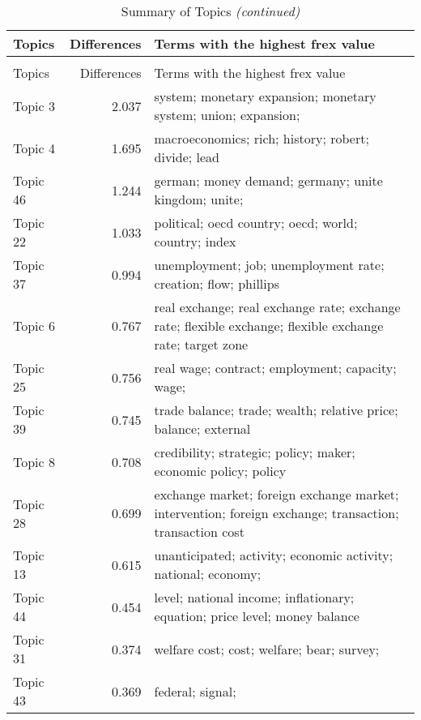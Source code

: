 \documentclass[
  12pt,
  onecolumn]{article}
\begin{document}
\begingroup\fontsize{9}{11}\selectfont

\begin{longtable}[t]{>{}l>{}r>{\raggedright\arraybackslash}m{25em}}
\caption{\label{tab:summary-topics}Summary of Topics}\\
\toprule
Topics & Differences & Terms with the highest frex value\\
\midrule
\endfirsthead
\caption[]{Summary of Topics \textit{(continued)}}\\
\toprule
Topics & Differences & Terms with the highest frex value\\
\midrule
\endhead

\endfoot
\bottomrule
\endlastfoot
Topic 3 & 2.037 & system;
monetary
expansion;
monetary
system;
union;
expansion;
\cellcolor{gray!6}{stability}\\
Topic 4 & 1.695 & macroeconomics;
rich;
history;
robert;
divide;
lead\\
Topic 46 & 1.244 & german;
money
demand;
germany;
unite
kingdom;
unite;
\cellcolor{gray!6}{kingdom}\\
Topic 22 & 1.033 & political;
oecd
country;
oecd;
world;
country;
index\\
Topic 37 & 0.994 & unemployment;
job;
unemployment
rate;
creation;
flow;
phillips
\cellcolor{gray!6}{curve}\\
\addlinespace
Topic 6 & 0.767 & real
exchange;
real
exchange
rate;
exchange
rate;
flexible
exchange;
flexible
exchange
rate;
target
zone\\
Topic 25 & 0.756 & real
wage;
contract;
employment;
capacity;
wage;
\cellcolor{gray!6}{stickiness}\\
Topic 39 & 0.745 & trade
balance;
trade;
wealth;
relative
price;
balance;
external\\
Topic 8 & 0.708 & credibility;
strategic;
policy;
maker;
economic
policy;
policy
\cellcolor{gray!6}{rule}\\
Topic 28 & 0.699 & exchange
market;
foreign
exchange
market;
intervention;
foreign
exchange;
transaction;
transaction
cost\\
\addlinespace
Topic 13 & 0.615 & unanticipated;
activity;
economic
activity;
national;
economy;
\cellcolor{gray!6}{gap}\\
Topic 44 & 0.454 & level;
national
income;
inflationary;
equation;
price
level;
money
balance\\
Topic 31 & 0.374 & welfare
cost;
cost;
welfare;
bear;
survey;
\cellcolor{gray!6}{household}\\
Topic 43 & 0.369 & federal;
signal;

\end{longtable}
\end{document}
